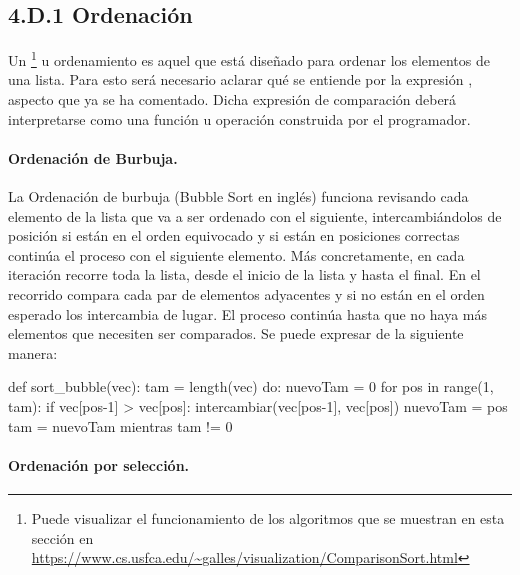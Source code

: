
\subsection*{4.D.1 Ordenación}


Un \footnote{Puede visualizar el funcionamiento de los algoritmos que se muestran en esta sección en \url{https://www.cs.usfca.edu/~galles/visualization/ComparisonSort.html}} u ordenamiento es aquel que está diseñado para ordenar los elementos de una lista. Para esto será necesario aclarar qué se entiende por la expresión , aspecto que ya se ha comentado. Dicha expresión de comparación deberá interpretarse como una función u operación construida por el programador.



\paragraph*{Ordenación de Burbuja.} La Ordenación de burbuja (Bubble Sort en inglés) funciona revisando cada elemento de la lista que va a ser ordenado con el siguiente, intercambiándolos de posición si están en el orden equivocado y si están en posiciones correctas continúa el proceso con el siguiente elemento. Más concretamente, en cada iteración recorre toda la lista,  desde el inicio de la lista  y hasta el final. En el recorrido compara cada par de elementos adyacentes y si no están en el orden esperado los intercambia de lugar. El proceso continúa hasta que no haya más elementos que necesiten ser comparados. Se puede expresar de la siguiente manera:

\begin{pyverbatim}[][frame=single]
def sort_bubble(vec):
  tam = length(vec)
  do:
    nuevoTam = 0
    for pos in range(1, tam):
      if vec[pos-1] > vec[pos]:
        intercambiar(vec[pos-1], vec[pos])
        nuevoTam = pos
    tam = nuevoTam
  mientras tam != 0
\end{pyverbatim} 


\paragraph*{Ordenación por selección.} 

